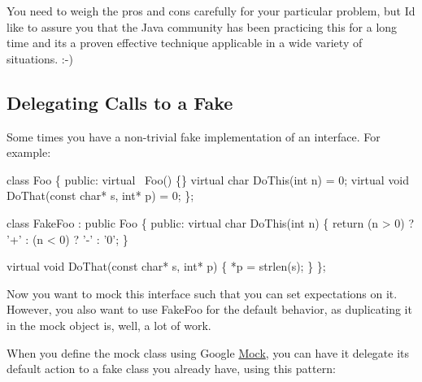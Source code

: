 You need to weigh the pros and cons carefully for your particular problem, but I\textquotesingle{}d like to assure you that the Java community has been practicing this for a long time and it\textquotesingle{}s a proven effective technique applicable in a wide variety of situations. \+:-\/)

\subsection*{Delegating Calls to a Fake}

Some times you have a non-\/trivial fake implementation of an interface. For example\+:


\begin{DoxyCode}
\textcolor{keyword}{class }Foo \{
 \textcolor{keyword}{public}:
  \textcolor{keyword}{virtual} ~Foo() \{\}
  \textcolor{keyword}{virtual} \textcolor{keywordtype}{char} DoThis(\textcolor{keywordtype}{int} n) = 0;
  \textcolor{keyword}{virtual} \textcolor{keywordtype}{void} DoThat(\textcolor{keyword}{const} \textcolor{keywordtype}{char}* s, \textcolor{keywordtype}{int}* p) = 0;
\};

\textcolor{keyword}{class }FakeFoo : \textcolor{keyword}{public} Foo \{
 \textcolor{keyword}{public}:
  \textcolor{keyword}{virtual} \textcolor{keywordtype}{char} DoThis(\textcolor{keywordtype}{int} n) \{
    \textcolor{keywordflow}{return} (n > 0) ? \textcolor{charliteral}{'+'} :
        (n < 0) ? \textcolor{charliteral}{'-'} : \textcolor{charliteral}{'0'};
  \}

  \textcolor{keyword}{virtual} \textcolor{keywordtype}{void} DoThat(\textcolor{keyword}{const} \textcolor{keywordtype}{char}* s, \textcolor{keywordtype}{int}* p) \{
    *p = strlen(s);
  \}
\};
\end{DoxyCode}


Now you want to mock this interface such that you can set expectations on it. However, you also want to use {\ttfamily Fake\+Foo} for the default behavior, as duplicating it in the mock object is, well, a lot of work.

When you define the mock class using Google \hyperlink{classMock}{Mock}, you can have it delegate its default action to a fake class you already have, using this pattern\+:


